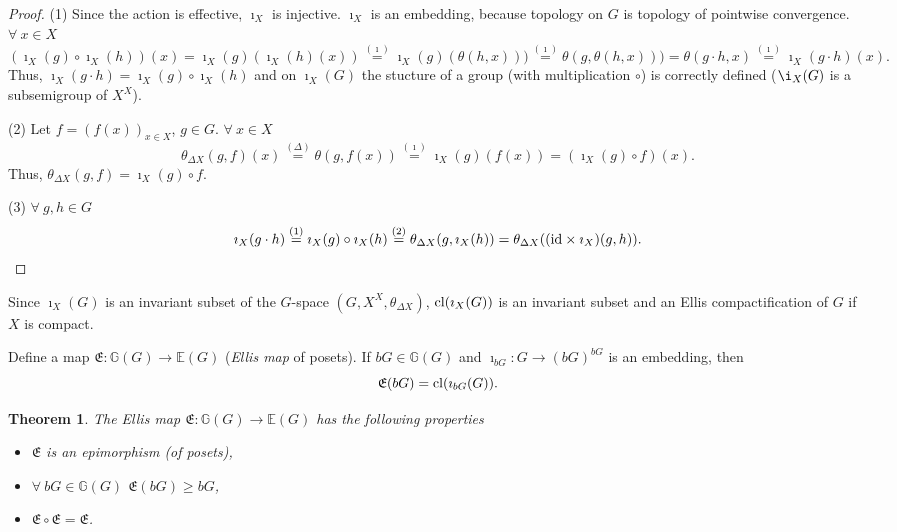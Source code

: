 \documentclass{amsart}
\newtheorem{thm}{Theorem}[section]
\newcommand{\cl}{\mbox{{\rm cl}}}
\newcommand{\id}{\mbox{{\rm id}}}
\begin{document}
\begin{proof} (1) Since the action is effective, $\imath_X$ is injective. $\imath_X$ is an embedding, because topology on $G$ is topology of pointwise convergence. $\forall\ x\in X$ 
$$(\imath_X (g)\circ \imath_X (h))(x)=\imath_X (g)(\imath_X (h)(x))\stackrel{(\imath)}{=}\imath_X (g)(\theta (h, x)))\stackrel{(\imath)}{=}\theta (g, \theta(h, x)))=\theta (g\cdot h, x)\stackrel{(\imath)}{=}\imath_X (g\cdot h)(x).$$
Thus, $\imath_X (g\cdot h)=\imath_X (g)\circ \imath_X (h)$ and on $\imath_X (G)$ the stucture of a group (with multiplication $\circ$) is correctly defined ($\i_X (G)$ is a subsemigroup of $X^X$). 

(2) Let $f=(f(x))_{x\in X}$, $g\in G$.  $\forall\ x\in X$ 
$$\theta_{\Delta X} (g,  f)(x)\stackrel{(\Delta)}{=}\theta (g, f(x))\stackrel{(\imath)}{=}\imath_X (g) (f(x))=(\imath_X (g)\circ f)(x).$$
Thus, $\theta_{\Delta X} (g,  f)=\imath_X (g)\circ f$.

(3) $\forall\ g, h\in G$ 
$$\imath_X (g\cdot h)\stackrel{(1)}{=}\imath_X (g)\circ\imath_X (h)\stackrel{(2)}{=}\theta_{\Delta X}(g, \imath_X (h))=\theta_{\Delta X}((\id\times \imath_X) (g, h)).$$
\end{proof}

Since $\imath_X (G)$ is an invariant subset of the $G$-space $(G, X^X, \theta_{\Delta X})$, $\cl (\imath_X (G))$ is an invariant subset and an Ellis compactification of $G$ if $X$ is compact.

Define a map $\mathfrak{E}: \mathbb{G} (G)\to \mathbb{E} (G)$ ({\it Ellis map} of posets). If $b G\in\mathbb{G}(G)$ and $\imath_{b G}: G\to (b G)^{b G}$ is an embedding, then 
$$\mathfrak{E}(b G)={\rm cl} (\imath_{b G} (G)).$$

\begin{thm}\label{thm1}
The Ellis map $\mathfrak{E}:\mathbb{G}(G)\to \mathbb{E} (G)$ has the following properties
\begin{itemize}
\item $\mathfrak{E}$ is an epimorphism {\rm(}of posets{\rm)}, 
\item $\forall\ b G\in \mathbb{G} (G)$  $\mathfrak{E}(b G)\geq b G$, 
\item $\mathfrak{E}\circ\mathfrak{E}=\mathfrak{E}$.
\end{itemize}
\end{thm}
\end{document}

